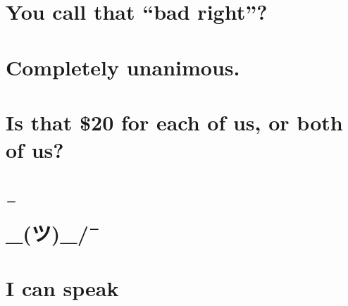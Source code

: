 \chapter{You call that ``bad right''?} %

\chapter{Completely unanimous.} %

\chapter{Is that \$20 for each of us, or both of us?} %

\chapter{¯\\_(ツ)_/¯} %

\chapter{I can speak } %

